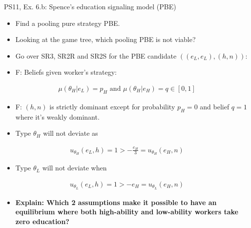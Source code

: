 \begin{frame}{PS11, Ex. 6.b: Spence’s education signaling model (PBE)}
    \begin{multicols}{2}
      \begin{itemize}
        \item[(b)] Find a pooling pure strategy PBE.
        \item[Step 1:] Looking at the game tree, which pooling PBE is not viable?
        \item[Step 2:] Go over SR3, SR2R and SR2S for the PBE candidate $((e_L,e_L),(h,n))$:
        \item[SR3:] F: Beliefs given worker's strategy:
      \end{itemize}\vspace{-10pt}
      \begin{align*}
        \mu(\theta_H|e_L)=p_H\text{ and }\mu(\theta_H|e_H)=q\in[0,1]
      \end{align*}\vspace{-20pt}
      \begin{itemize}
        \item[SR2R:] F: $(h,n)$ is strictly dominant except for probability $p_H=0$ and belief $q=1$ where it's weakly dominant.
        \item[SR2S:] Type $\theta_H$ will not deviate as
      \end{itemize}\vspace{-12pt}
      \begin{align*}
        u_{\theta_H}(e_L,h)=1>-\frac{e_H}{3}=u_{\theta_H}(e_H,n)
      \end{align*}\vspace{-20pt}
      \begin{itemize}
        \item[] Type $\theta_L$ will not deviate when
      \end{itemize}\vspace{-12pt}
      \begin{align*}
        u_{\theta_L}(e_L,h)=1>-e_H=u_{\theta_L}(e_H,n)
      \end{align*}\vspace{-20pt}
      \begin{itemize}
        \item[Step 3:] \textbf{Explain: Which 2 assumptions make it possible to have an equilibrium where both high-ability and low-ability workers take zero education?}
      \end{itemize}
      \vfill\null\columnbreak
      \begin{figure}[!h]

\end{figure}
\end{multicols}
\end{frame}
